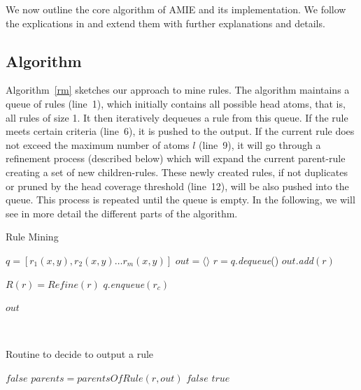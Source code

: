 
We now outline the core algorithm of AMIE and its implementation.
We follow the explications in \cite{amie} and extend them with further explanations and details.

\subsection{Algorithm}
\label{subsec:algorithm}

Algorithm~\ref{rm} sketches our approach to mine rules. 
The algorithm maintains a queue of rules (line~1), which initially contains all possible head atoms, that is, all rules of size 1.
It then iteratively dequeues a rule from this queue.
If the rule meets certain criteria (line~6), it is pushed to the output.
If the current rule does not exceed the maximum number of atoms $l$ (line~9), it will go through a refinement process (described below) which
will expand the current parent-rule creating a set of new children-rules. These newly created rules, if not duplicates or pruned by the head coverage threshold (line~12),  
will be also pushed into the queue.
This process is repeated until the queue is empty. 
In the following, we will see in more detail the different parts of the algorithm.





\begin{algorithm}
\caption{Rule Mining}
\label{rm}
\begin{algorithmic}[1]
    \State $q = [r_1(x,y), r_2(x,y) \dots r_m(x,y)] $
    \State $out = \langle \rangle$
	  \State $r = q.$\emph{dequeue}()
	      \State $out.$\emph{add}$(r)$	
	  \EndIf
	  
	    \State $R(r) = Refine(r)$	    
			\State $q.$\emph{enqueue}$(r_c)$		      
		    \EndIf
	    \EndFor
	    
	  \EndIf  
	  
	\EndWhile
    \State \Return $out$
\EndFunction
\end{algorithmic}
\end{algorithm}
\ \\[-1cm]
\begin{algorithm}
\caption{Routine to decide to output a rule}
\label{pfo}
\begin{algorithmic}[1]
      \State \Return $false$
    \EndIf 
    \State $parents = parentsOfRule(r, out)$
	\State \Return $false$
      \EndIf
    \EndFor
    \State \Return $true$
\EndFunction
\end{algorithmic}
\end{algorithm}

